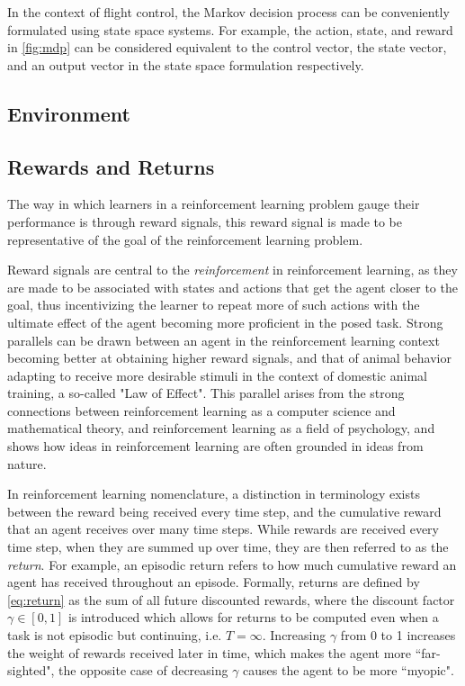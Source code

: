 \documentclass[../report.tex]{subfiles}
\begin{document}
In the context of flight control, the Markov decision process can be conveniently formulated using state space systems. For example, the action, state, and reward in \autoref{fig:mdp} can be considered equivalent to the control vector, the state vector, and an output vector in the state space formulation respectively. 

\subsection{Environment}

\subsection{Rewards and Returns}

The way in which learners in a reinforcement learning problem gauge their performance is through reward signals, this reward signal is made to be representative of the goal of the reinforcement learning problem.

Reward signals are central to the \textit{reinforcement} in reinforcement learning, as they are made to be associated with states and actions that get the agent closer to the goal, thus incentivizing the learner to repeat more of such actions with the ultimate effect of the agent becoming more proficient in the posed task. Strong parallels can be drawn between an agent in the reinforcement learning context becoming better at obtaining higher reward signals, and that of animal behavior adapting to receive more desirable stimuli in the context of domestic animal training, a so-called "Law of Effect"\cite{law_of_effect}. This parallel arises from the strong connections between reinforcement learning as a computer science and mathematical theory, and reinforcement learning as a field of psychology, and shows how ideas in reinforcement learning are often grounded in ideas from nature. 

In reinforcement learning nomenclature, a distinction in terminology exists between the reward being received every time step, and the cumulative reward that an agent receives over many time steps. While rewards are received every time step, when they are summed up over time, they are then referred to as the \textit{return}. For example, an episodic return refers to how much cumulative reward an agent has received throughout an episode. Formally, returns are defined by \autoref{eq:return} as the sum of all future discounted rewards, where the discount factor $\gamma \in [0,1]$ is introduced which allows for returns to be computed even when a task is not episodic but continuing, i.e. $T=\infty$. Increasing $\gamma$ from 0 to 1 increases the weight of rewards received later in time, which makes the agent more ``far-sighted", the opposite case of decreasing $\gamma$ causes the agent to be more ``myopic".
\end{document}
